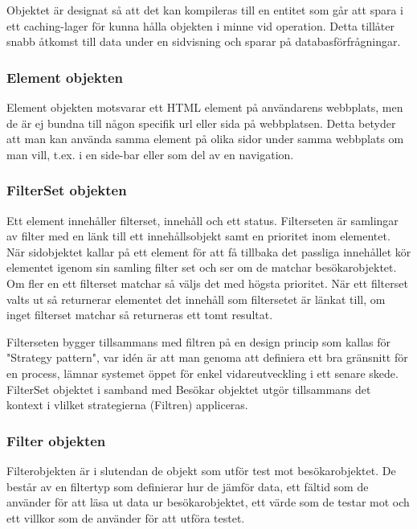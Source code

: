 Objektet är designat så att det kan kompileras till en entitet som går att spara i ett caching-lager för kunna hålla objekten i minne vid operation. Detta tillåter snabb åtkomst till data under en sidvisning och sparar på databasförfrågningar.

\subsubsection{Element objekten}



Element objekten motsvarar ett HTML element på användarens webbplats, men de är ej bundna till någon specifik url eller sida på webbplatsen. Detta betyder att man kan använda samma element på olika sidor under samma webbplats om man vill, t.ex. i en side-bar eller som del av en navigation.

\subsubsection{FilterSet objekten}



Ett element innehåller filterset, innehåll och ett status. Filterseten är samlingar av filter med en länk till ett innehållsobjekt samt en prioritet inom elementet. När sidobjektet kallar på ett element för att få tillbaka det passliga innehållet kör elementet igenom sin samling filter set och ser om de matchar besökarobjektet. Om fler en ett filterset matchar så väljs det med högsta prioritet. När ett filterset valts ut så returnerar elementet det innehåll som filtersetet är länkat till, om inget filterset matchar så returneras ett tomt resultat.

Filterseten bygger tillsammans med filtren på en design princip som kallas för "Strategy pattern", var idén är att man genoma att definiera ett bra gränsnitt för en process, lämnar systemet öppet för enkel vidareutveckling i ett senare skede. FilterSet objektet i samband med Besökar objektet utgör tillsammans det kontext i vlilket strategierna (Filtren) appliceras.

\subsubsection{Filter objekten}



Filterobjekten är i slutendan de objekt som utför test mot besökarobjektet. De består av en filtertyp som definierar hur de jämför data, ett fältid som de använder för att läsa ut data ur besökarobjektet, ett värde som de testar mot och ett villkor som de använder för att utföra testet.


